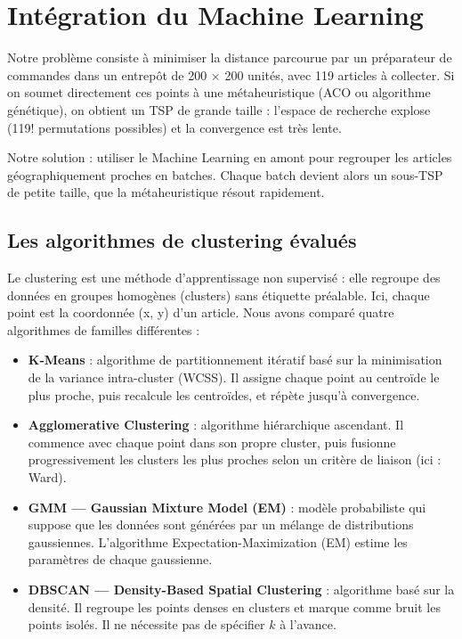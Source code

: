 \documentclass[a4paper, 12pt, twoside]{report}
\begin{document}
\chapter{Intégration du Machine Learning}

Notre problème consiste à minimiser la distance parcourue par un préparateur de commandes dans un entrepôt de 200 × 200 unités, avec 119 articles à collecter. Si on soumet directement ces points à une métaheuristique (ACO ou algorithme génétique), on obtient un TSP de grande taille : l'espace de recherche explose (119! permutations possibles) et la convergence est très lente.

Notre solution : utiliser le Machine Learning en amont pour regrouper les articles géographiquement proches en batches. Chaque batch devient alors un sous-TSP de petite taille, que la métaheuristique résout rapidement.

\section{Les algorithmes de clustering évalués}
Le clustering est une méthode d'apprentissage non supervisé : elle regroupe des données en groupes homogènes (clusters) sans étiquette préalable. Ici, chaque point est la coordonnée (x, y) d'un article. Nous avons comparé quatre algorithmes de familles différentes :
\begin{itemize}
    \item \textbf{K-Means} : algorithme de partitionnement itératif basé sur la
    minimisation de la variance intra-cluster (WCSS). Il assigne chaque point au
    centroïde le plus proche, puis recalcule les centroïdes, et répète jusqu'à
    convergence.

    \item \textbf{Agglomerative Clustering} : algorithme hiérarchique ascendant.
    Il commence avec chaque point dans son propre cluster, puis fusionne
    progressivement les clusters les plus proches selon un critère de liaison
    (ici : Ward).

    \item \textbf{GMM --- Gaussian Mixture Model (EM)} : modèle probabiliste qui
    suppose que les données sont générées par un mélange de distributions
    gaussiennes. L'algorithme Expectation-Maximization (EM) estime les paramètres
    de chaque gaussienne.

    \item \textbf{DBSCAN --- Density-Based Spatial Clustering} : algorithme basé
    sur la densité. Il regroupe les points denses en clusters et marque comme
    bruit les points isolés. Il ne nécessite pas de spécifier $k$ à l'avance.
\end{itemize}
\end{document}
